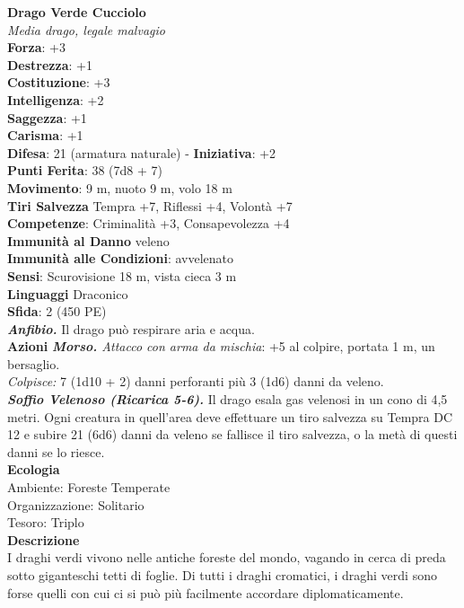 \begin{multicols}{2}
\medskip\textbf{Drago Verde Cucciolo}\\
\emph{Media drago, legale malvagio}\\
\textbf{Forza}: +3\\
\textbf{Destrezza}: +1\\
\textbf{Costituzione}: +3\\
\textbf{Intelligenza}: +2\\
\textbf{Saggezza}: +1\\
\textbf{Carisma}: +1\\
\textbf{Difesa}: 21 (armatura naturale) - \textbf{Iniziativa}: +2\\
\textbf{Punti Ferita}: 38 (7d8 + 7)\\
\textbf{Movimento}: 9 m, nuoto 9 m, volo 18 m\\
\textbf{Tiri Salvezza} Tempra +7, Riflessi +4, Volontà +7\\
\textbf{Competenze}: Criminalità +3, Consapevolezza +4\\
\textbf{Immunità al Danno} veleno \\
\textbf{Immunità alle Condizioni}: avvelenato\\
\textbf{Sensi}: Scurovisione 18 m, vista cieca 3 m \\
\textbf{Linguaggi} Draconico\\
\textbf{Sfida}: 2 (450 PE)\smallskip\\
\emph{\textbf{Anfibio.}} Il drago può respirare aria e acqua.\\
\smallskip\textbf{Azioni}
\emph{\textbf{Morso.} Attacco con arma da mischia}: +5 al colpire, portata 1 m, un bersaglio.\\
\emph{Colpisce:} 7 (1d10 + 2) danni perforanti più 3 (1d6) danni da veleno.\\
\emph{\textbf{Soffio Velenoso (Ricarica 5-6).}} Il drago esala gas velenosi in un cono di 4,5 metri. Ogni creatura in quell'area deve effettuare un tiro salvezza su Tempra DC  12 e subire 21 (6d6) danni da veleno se fallisce il tiro salvezza, o la metà di questi danni se lo riesce.\\
\textbf{Ecologia}\\
Ambiente: Foreste Temperate\\
Organizzazione: Solitario\\
Tesoro: Triplo\\
\textbf{Descrizione}\\
I draghi verdi vivono nelle antiche foreste del mondo, vagando in cerca di preda sotto giganteschi tetti di foglie. Di tutti i draghi cromatici, i draghi verdi sono forse quelli con cui ci si può più facilmente accordare diplomaticamente.\\


\end{multicols}

